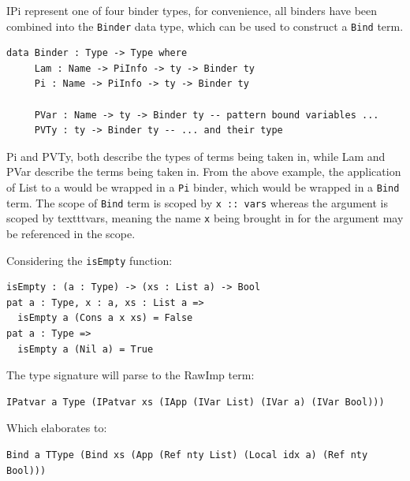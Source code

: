 \documentclass[a4paper]{article}
\begin{document}
IPi represent one of four binder types, for convenience, all binders have been combined into
the \texttt{Binder} data type, which can be used to construct a \texttt{Bind} term. 

\begin{center}
  \begin{verbatim} 
data Binder : Type -> Type where
     Lam : Name -> PiInfo -> ty -> Binder ty
     Pi : Name -> PiInfo -> ty -> Binder ty

     PVar : Name -> ty -> Binder ty -- pattern bound variables ...
     PVTy : ty -> Binder ty -- ... and their type
\end{verbatim}
\end{center}

Pi and PVTy, both describe the types of terms being taken in, while Lam and
PVar describe the terms being taken in. From the above example, the application of 
List to a would be wrapped in a \texttt{Pi} binder, which would be wrapped in a \texttt{Bind} term.
The scope of \texttt{Bind} term is scoped by \texttt{x :: vars} whereas the argument is scoped by texttt{vars},
meaning the name \texttt{x} being brought in for the argument may be referenced in the scope. 

Considering the \texttt{isEmpty} function:

\begin{center}
  \begin{verbatim} 
isEmpty : (a : Type) -> (xs : List a) -> Bool
pat a : Type, x : a, xs : List a =>
  isEmpty a (Cons a x xs) = False
pat a : Type =>
  isEmpty a (Nil a) = True
  \end{verbatim}
\end{center}

The type signature will parse to the RawImp term:

\begin{center}
  \begin{verbatim} 
IPatvar a Type (IPatvar xs (IApp (IVar List) (IVar a) (IVar Bool)))
\end{verbatim}
\end{center}

Which elaborates to:

\begin{center}
  \begin{verbatim} 
Bind a TType (Bind xs (App (Ref nty List) (Local idx a) (Ref nty Bool)))
\end{verbatim}
\end{center}
\end{document}
